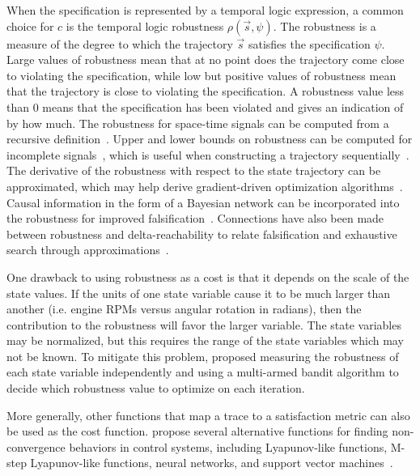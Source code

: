 When the specification is represented by a temporal logic expression, a common choice for $c$ is the temporal logic robustness $\rho(\vec{s}, \psi)$. The robustness is a measure of the degree to which the trajectory $\vec{s}$ satisfies the specification $\psi$. Large values of robustness mean that at no point does the trajectory come close to violating the specification, while low but positive values of robustness mean that the trajectory is close to violating the specification. A robustness value less than \num{0} means that the specification has been violated and gives an indication of by how much. The robustness for space-time signals can be computed from a recursive definition~\cite{fainekos2009robustness, Donze2010robust,fainekos2009robustness,yang2013dynamic}. Upper and lower bounds on robustness can be computed for incomplete signals~\cite{dreossi2015efficient}, which is useful when constructing a trajectory sequentially~\cite{dreossi2015efficient,ernst2019fast}. The derivative of the robustness with respect to the state trajectory can be approximated, which may help derive gradient-driven optimization algorithms~\cite{pant2017smooth}. Causal information in the form of a Bayesian network can be incorporated into the robustness for improved falsification~\cite{akazaki2017causality}. 
Connections have also been made between robustness and delta-reachability to relate falsification and exhaustive search through approximations~\cite{abbas2017relaxed}.

One drawback to using robustness as a cost is that it depends on the scale of the state values. If the units of one state variable cause it to be much larger than another (i.e. engine RPMs versus angular rotation in radians), then the contribution to the robustness will favor the larger variable. The state variables may be normalized, but this requires the range of the state variables which may not be known. To mitigate this problem, \textcite{zhang2019multi} proposed measuring the robustness of each state variable independently and using a multi-armed bandit algorithm to decide which robustness value to optimize on each iteration.

More generally, other functions that map a trace to a satisfaction metric can also be used as the cost function.  \textcite{balkan2017underminer} propose several alternative functions for finding non-convergence behaviors in control systems, including Lyapunov-like functions, M-step Lyapunov-like functions, neural networks, and support vector machines~\cite{balkan2017underminer}. 

